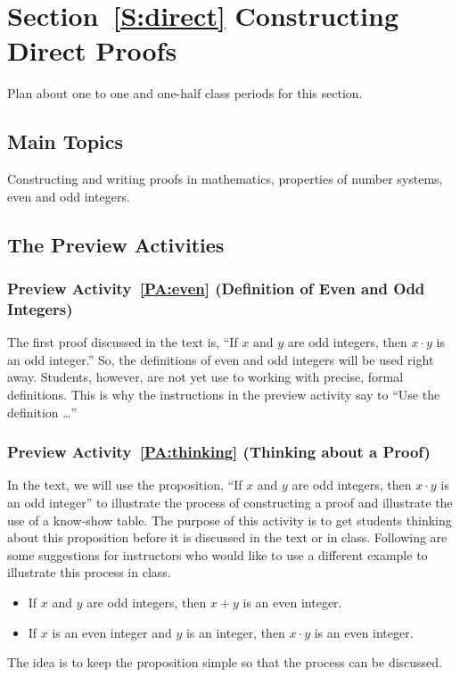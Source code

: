 \section*{Section~\ref{S:direct} Constructing Direct Proofs}
Plan about one to one and one-half class periods for this section.

\subsection*{Main Topics}
Constructing and writing proofs in mathematics, properties of number systems, even and odd integers.  

\subsection*{The Preview Activities}
\subsubsection*{Preview Activity~\ref{PA:even} (Definition of Even and Odd Integers)}  
The first proof discussed in the text is, ``If $x$ and $y$ are odd integers, then $x \cdot y$ is an odd integer.''  So, the definitions of even and odd integers will be used right away.  Students, however, are not yet use to working with precise, formal definitions.  This is why the instructions in the preview activity say to ``Use the definition \ldots''

\subsubsection*{Preview Activity~\ref{PA:thinking} (Thinking about a Proof)}  In the text, we will use the proposition, ``If $x$ and $y$ are odd integers, then $x \cdot y$ is an odd integer'' to illustrate the process of constructing a proof and illustrate the use of a know-show table.  The purpose of this activity is to get students thinking about this proposition before it is discussed in the text or in class.  Following are some suggestions for instructors who would like to use a different example to illustrate this process in class.
\begin{itemize}
\item If $x$ and $y$ are odd integers, then $x + y$ is an even integer.
\item If $x$ is an even integer and $y$ is an integer, then $x \cdot y$ is an even integer.
\end{itemize}
The idea is to keep the proposition simple so that the process can be discussed.
\hbreak


